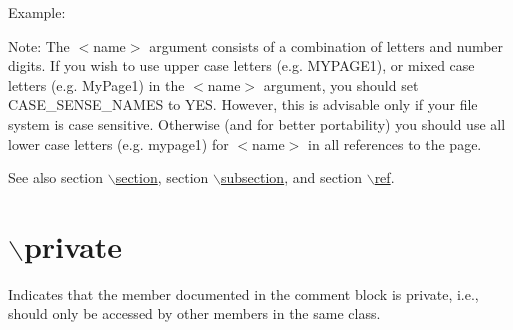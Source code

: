 \begin{DoxyParagraph}{Example:}

 
\end{DoxyParagraph}
\begin{DoxyParagraph}{Note: }
The $<$name$>$ argument consists of a combination of letters and number digits. If you wish to use upper case letters (e.g. {\ttfamily MYPAGE1}), or mixed case letters (e.g. {\ttfamily MyPage1}) in the $<$name$>$ argument, you should set {\ttfamily CASE\_\-SENSE\_\-NAMES} to {\ttfamily YES}. However, this is advisable only if your file system is case sensitive. Otherwise (and for better portability) you should use all lower case letters (e.g. {\ttfamily mypage1}) for $<$name$>$ in all references to the page.
\end{DoxyParagraph}
\begin{DoxySeeAlso}{See also}
section \hyperlink{commands_cmdsection}{$\backslash$section}, section \hyperlink{commands_cmdsubsection}{$\backslash$subsection}, and section \hyperlink{commands_cmdref}{$\backslash$ref}.
\end{DoxySeeAlso}


 \hypertarget{commands_cmdprivate}{}\section{$\backslash$private}\label{commands_cmdprivate}
  Indicates that the member documented in the comment block is private, i.e., should only be accessed by other members in the same class.

